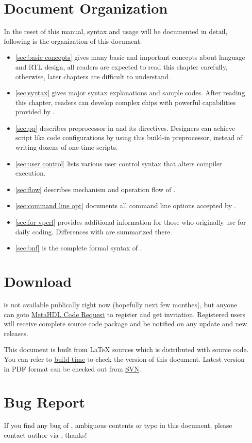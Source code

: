 \section{Document Organization}
In the reset of this manual, \mhdl{} syntax and usage will be
documented in detail, following is the organization of this document:
\begin{itemize}
\item \autoref{sec:basic concepts} gives many basic and important concepts about
language and RTL design, all readers are expected to read this chapter
carefully, otherwise, later chapters are difficult to understand.
\item \autoref{sec:syntax} gives major syntax explanations and sample codes. 
After reading this chapter, readers can develop complex chips with
powerful capabilities provided by \mhdl{}.
\item \autoref{sec:pp} describes preprocessor in \mhdlc{} and its directives. Designers can 
achieve script like code configurations by using this build-in
preprocessor, instead of writing dozens of one-time scripts.
\item \autoref{sec:user control} lists various user control syntax that alters compiler execution. 
\item \autoref{sec:flow} describes mechanism and operation flow of \mhdlc{}.
\item \autoref{sec:command line opt} documents all command line options accepted by \mhdlc{}.
\item \autoref{sec:for vperl} provides additional information for those who originally use \vperl{} 
for daily coding. Differences with \vperl{} are summarized there.
\item \autoref{sec:bnf} is the complete formal syntax of \mhdl{}.
\end{itemize}

\section{Download}
\mhdlc{} is not available publically right now (hopefully next few monthes),
but anyone can goto \href{http://metahdl.tech.officelive.com/download.aspx}{MetaHDL Code Request} to register and get invitation. Registered users will receive
complete source code package and be notified on any update and new releases. 

This document is built from \LaTeX{} sources which is distributed with \mhdlc{}
source code. You can refer to \hyperref[build time]{build time} to check the 
version of this document. Latest version in PDF format can be checked out 
from \href{http://code.google.com/p/metahdl/source/checkout}{SVN}. 

\section{Bug Report}
If you find any bug of \mhdlc{}, ambiguous contents or typo in this
document, please contact author via
\href{mailto:\DocAuthor}{\DocAuthor}, thanks!




